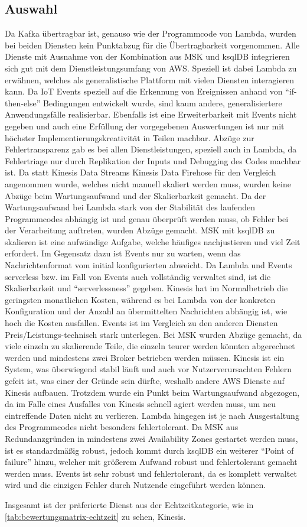 \subsection{Auswahl}
Da Kafka übertragbar ist, genauso wie der Programmcode von Lambda, wurden bei beiden Diensten kein Punktabzug für die Übertragbarkeit vorgenommen. Alle Dienste mit Ausnahme von der Kombination aus \ac{MSK} und ksqlDB integrieren sich gut mit dem Dienstleistungsumfang von \ac{AWS}. Speziell ist dabei Lambda zu erwähnen, welches als generalistische Plattform mit vielen Diensten interagieren kann. Da \ac{IoT} Events speziell auf die Erkennung von Ereignissen anhand von \enquote{if-then-else} Bedingungen entwickelt wurde, sind kaum andere, generalisiertere Anwendungsfälle realisierbar. Ebenfalls ist eine Erweiterbarkeit mit \AWSIOT{} Events nicht gegeben und auch eine Erfüllung der vorgegebenen Auswertungen ist nur mit höchster Implementierungskreativität in Teilen machbar. Abzüge zur Fehlertransparenz gab es bei allen Dienstleistungen, speziell auch in Lambda, da Fehlertriage nur durch Replikation der Inputs und Debugging des Codes machbar ist. Da statt Kinesis Data Streams Kinesis Data Firehose für den Vergleich angenommen wurde, welches nicht manuell skaliert werden muss, wurden keine Abzüge beim Wartungsaufwand und der Skalierbarkeit gemacht. Da der Wartungsaufwand bei Lambda stark von der Stabilität des laufenden Programmcodes abhängig ist und genau überprüft werden muss, ob Fehler bei der Verarbeitung auftreten, wurden Abzüge gemacht. \ac{MSK} mit ksqlDB zu skalieren ist eine aufwändige Aufgabe, welche häufiges nachjustieren und viel Zeit erfordert. Im Gegensatz dazu ist \AWSIOT{} Events nur zu warten, wenn das Nachrichtenformat vom initial konfigurierten abweicht. Da Lambda und \AWSIOT{} Events serverless bzw. im Fall von \AWSIOT{} Events auch vollständig verwaltet sind, ist die Skalierbarkeit und \enquote{serverlessness} gegeben. Kinesis hat im Normalbetrieb die geringsten monatlichen Kosten, während es bei Lambda von der konkreten Konfiguration und der Anzahl an übermittelten Nachrichten abhängig ist, wie hoch die Kosten ausfallen. \AWSIOT{} Events ist im Vergleich zu den anderen Diensten Preis/Leistungs-technisch stark unterlegen. Bei \ac{MSK} wurden Abzüge gemacht, da viele einzeln zu skalierende Teile, die einzeln teurer werden könnten abgerechnet werden und mindestens zwei Broker betrieben werden müssen. Kinesis ist ein System, was überwiegend stabil läuft und auch vor Nutzerverursachten Fehlern gefeit ist, was einer der Gründe sein dürfte, weshalb andere \ac{AWS} Dienste auf Kinesis aufbauen. Trotzdem wurde ein Punkt beim Wartungsaufwand abgezogen, da im Falle eines Ausfalles von Kinesis schnell agiert werden muss, um neu eintreffende Daten nicht zu verlieren. Lambda hingegen ist je nach Ausgestaltung des Programmcodes nicht besonders fehlertolerant. Da \ac{MSK} aus Redundanzgründen in mindestens zwei Availability Zones gestartet werden muss, ist es standardmäßig robust, jedoch kommt durch ksqlDB ein weiterer \enquote{Point of failure} hinzu, welcher mit größerem Aufwand robust und fehlertolerant gemacht werden muss. \AWSIOT{} Events ist sehr robust und fehlertolerant, da es komplett verwaltet wird und die einzigen Fehler durch Nutzende eingeführt werden können. 



Insgesamt ist der präferierte Dienst aus der Echtzeitkategorie, wie in \autoref{tab:bewertungsmatrix-echtzeit} zu sehen, Kinesis.

